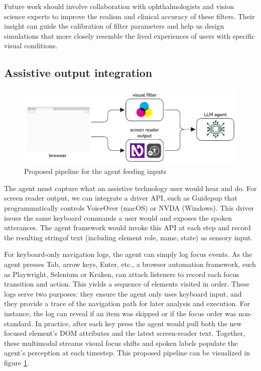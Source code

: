 Future work should involve collaboration with ophthalmologists and vision science experts to improve the realism and clinical accuracy of these filters. Their insight can guide the calibration of filter parameters and help us design simulations that more closely resemble the lived experiences of users with specific visual conditions.

\subsection{Assistive output integration}

\begin{figure}
    \centering
    \includegraphics[width=1\linewidth]{imgs/flow.png}
\caption{Proposed pipeline for the agent feeding inputs}
\label{fig:pipeline}
\end{figure}


The agent must capture what an assistive technology user would hear and do. For screen reader output, we can integrate a driver API, such as Guidepup that programmatically controls VoiceOver (macOS) or NVDA (Windows). This driver issues the same keyboard commands a user would and exposes the spoken utterances\cite{guidepup2025}. The agent framework would invoke this API at each step and record the resulting stringof text (including element role, name, state) as sensory input.

For keyboard-only navigation logs, the agent can simply log focus events. As the agent presses Tab, arrow keys, Enter, etc., a browser automation framework, such as Playwright, Selenium or Kraken, can attach listeners to record each focus transition and action. This yields a sequence of elements visited in order\cite{ravelo2023kraken}. These logs serve two purposes: they ensure the agent only uses keyboard input, and they provide a trace of the navigation path for later analysis and execution. For instance, the log can reveal if an item was skipped or if the focus order was non-standard. In practice, after each key press the agent would pull both the new focused element's DOM attributes and the latest screen-reader text. Together, these multimodal streams visual focus shifts and spoken labels populate the agent's perception at each timestep. This proposed pipeline can be visualized in figure \ref{fig:pipeline}.


